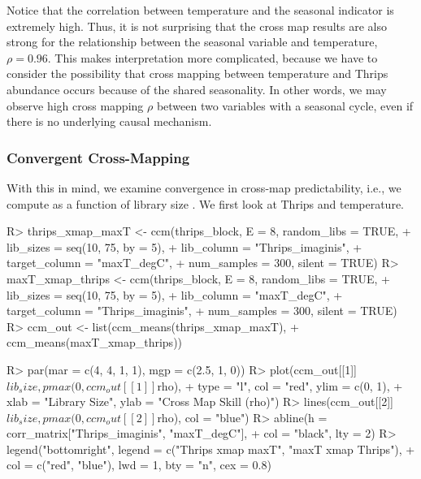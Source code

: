 \documentclass[article]{jss}
\begin{document}
Notice that the correlation between temperature and the seasonal indicator is extremely high. Thus, it is not surprising that the cross map results are also strong for the relationship between the seasonal variable and temperature, $\rho = 0.96$. This makes interpretation more complicated, because we have to consider the possibility that cross mapping between temperature and Thrips abundance occurs because of the shared seasonality. In other words, we may observe high cross mapping $\rho$ between two variables with a seasonal cycle, even if there is no underlying causal mechanism.

\subsubsection{Convergent Cross-Mapping}\label{sec:thrips-ccm}
With this in mind, we examine convergence in cross-map predictability, i.e., we compute  as a function of library size . We first look at Thrips and temperature.

\begin{Schunk}
\begin{Sinput}
R> thrips_xmap_maxT <- ccm(thrips_block, E = 8, random_libs = TRUE,
+                          lib_sizes = seq(10, 75, by = 5), 
+                          lib_column = "Thrips_imaginis", 
+                          target_column = "maxT_degC", 
+                          num_samples = 300, silent = TRUE)
R> maxT_xmap_thrips <- ccm(thrips_block, E = 8, random_libs = TRUE,
+                          lib_sizes = seq(10, 75, by = 5), 
+                          lib_column = "maxT_degC", 
+                          target_column = "Thrips_imaginis", 
+                          num_samples = 300, silent = TRUE)
R> ccm_out <- list(ccm_means(thrips_xmap_maxT), 
+                  ccm_means(maxT_xmap_thrips))
\end{Sinput}
\end{Schunk}

\begin{Schunk}
\begin{Sinput}
R> par(mar = c(4, 4, 1, 1), mgp = c(2.5, 1, 0))
R> plot(ccm_out[[1]]$lib_size, pmax(0, ccm_out[[1]]$rho), 
+       type = "l", col = "red", ylim = c(0, 1), 
+       xlab = "Library Size", ylab = "Cross Map Skill (rho)")
R> lines(ccm_out[[2]]$lib_size, pmax(0, ccm_out[[2]]$rho), col = "blue")
R> abline(h = corr_matrix["Thrips_imaginis", "maxT_degC"], 
+         col = "black", lty = 2)
R> legend("bottomright", legend = c("Thrips xmap maxT", "maxT xmap Thrips"),
+         col = c("red", "blue"), lwd = 1, bty = "n", cex = 0.8)
\end{Sinput}
\end{Schunk}
\end{document}
